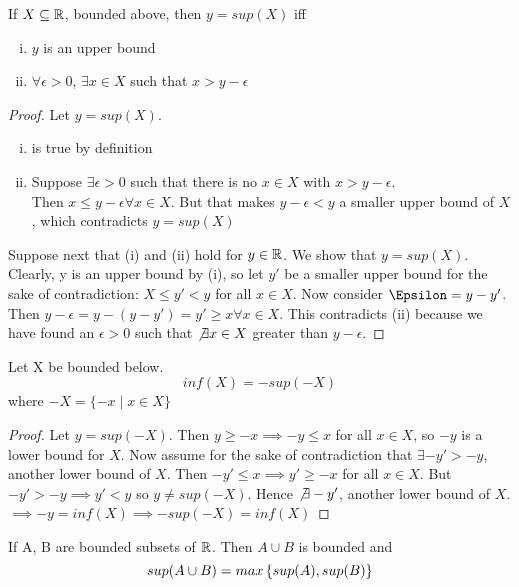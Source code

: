 \begin{proposition}
	If $X\subseteq \mathbb{R}$, bounded above, then $y = sup(X)$ iff
	\begin{enumerate}[(i)]
		\item $y$ is an upper bound
		\item $\forall \epsilon > 0$, $\exists x\in X$ such that $x>y-\epsilon$
	\end{enumerate}
\end{proposition}
\begin{proof}
Let $y = sup(X)$. \begin{enumerate}[(i)]
\item is true by definition
\item Suppose $\exists \epsilon > 0$ such that there is no $x\in X$ with $x>y-\epsilon$. \\
Then $x\leq y-\epsilon \forall x\in X$. But that makes $y-\epsilon < y$ a smaller upper bound of $X$, which contradicts $y=sup(X)$
\end{enumerate}

Suppose next that (i) and (ii) hold for $y\in \mathbb{R}$. We show that $y = sup(X)$. Clearly, y is an upper bound by (i), so let $y'$ be a smaller upper bound for the sake of contradiction: $X\leq y' < y$ for all $x\in X$. Now consider $\Epsilon = y-y'$. Then $y-\epsilon = y- (y-y') = y' \geq x \forall x\in X$. This contradicts (ii) because we have found an $\epsilon > 0$ such that $\not \exists x \in X$ greater than $y-\epsilon$.
\end{proof}

\begin{proposition}
	Let X be bounded below.
	\[inf(X) = -sup(-X)\]
	where $-X = \{-x \mid x\in X\}$
\end{proposition}

\begin{proof}
	Let $y = sup (-X)$. Then $y \geq -x \implies -y \leq x$ for all $x\in X$, so $-y$ is a lower bound for $X$. Now assume for the sake of contradiction that $\exists -y' > -y$, another lower bound of $X$. Then $-y' \leq x \implies y' \geq -x$ for all $x\in X$. But $-y' > -y \implies y' < y$ so $y \neq sup(-X)$. Hence $\not \exists -y'$, another lower bound of $X$. $\implies -y = inf(X) \implies -sup(-X) = inf(X)$
\end{proof}

\begin{proposition}
	If A, B are bounded subsets of $\mathbb{R}$. Then $A\cup B$ is bounded and
	\[sup(A\cup B) = max\left\{ sup(A), sup(B) \right\}\]
\end{proposition}
